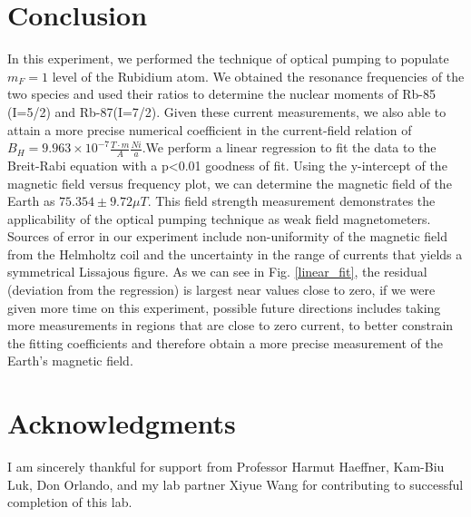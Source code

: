 \documentclass{sigchi}
\begin{document}
\section{Conclusion}\label{sec:conclusion}
 In this experiment, we performed the technique of optical pumping to populate $m_F=1$ level of the Rubidium atom. We obtained the resonance frequencies of the two species and used their ratios to determine the nuclear moments of Rb-85 (I=5/2) and Rb-87(I=7/2). Given these current measurements, we also able to attain a more precise numerical coefficient in the current-field relation of $B_{H} = 9.963\times 10^{-7}\frac{T\cdot m}{A} \frac{N i}{a}$.We perform a linear regression to fit the data to the Breit-Rabi equation with a p<0.01 goodness of fit. Using the y-intercept of the magnetic field versus frequency plot, we can determine the magnetic field of the Earth as $75.354\pm 9.72 \mu T$. This field strength measurement demonstrates the applicability of the optical pumping technique as weak field magnetometers. Sources of error in our experiment include non-uniformity of the magnetic field from the Helmholtz coil and the uncertainty in the range of currents that yields a symmetrical Lissajous figure. As we can see in Fig. \ref{linear_fit}, the residual (deviation from the regression) is largest near values close to zero, if we were given more time on this experiment, possible future directions includes taking more measurements in regions that are close to zero current, to better constrain the fitting coefficients and therefore obtain a more precise measurement of the Earth's magnetic field. 
\section*{Acknowledgments}
I am sincerely thankful for support from Professor Harmut Haeffner, Kam-Biu Luk, Don Orlando, and my lab partner Xiyue Wang for contributing to successful completion of this lab.



\end{document}
